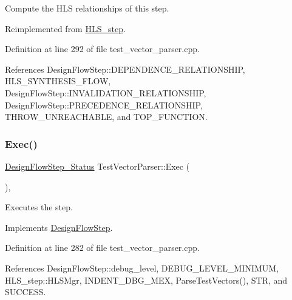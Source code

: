 Compute the H\+LS relationships of this step. 



Reimplemented from \hyperlink{classHLS__step_aed0ce8cca9a1ef18e705fc1032ad4de5}{H\+L\+S\+\_\+step}.



Definition at line 292 of file test\+\_\+vector\+\_\+parser.\+cpp.



References Design\+Flow\+Step\+::\+D\+E\+P\+E\+N\+D\+E\+N\+C\+E\+\_\+\+R\+E\+L\+A\+T\+I\+O\+N\+S\+H\+IP, H\+L\+S\+\_\+\+S\+Y\+N\+T\+H\+E\+S\+I\+S\+\_\+\+F\+L\+OW, Design\+Flow\+Step\+::\+I\+N\+V\+A\+L\+I\+D\+A\+T\+I\+O\+N\+\_\+\+R\+E\+L\+A\+T\+I\+O\+N\+S\+H\+IP, Design\+Flow\+Step\+::\+P\+R\+E\+C\+E\+D\+E\+N\+C\+E\+\_\+\+R\+E\+L\+A\+T\+I\+O\+N\+S\+H\+IP, T\+H\+R\+O\+W\+\_\+\+U\+N\+R\+E\+A\+C\+H\+A\+B\+LE, and T\+O\+P\+\_\+\+F\+U\+N\+C\+T\+I\+ON.

\mbox{\label{classTestVectorParser_a88660488c77a6d59a68893a4e74cf662}} 
\subsubsection{\texorpdfstring{Exec()}{Exec()}}
{\footnotesize\ttfamily \hyperlink{design__flow__step_8hpp_afb1f0d73069c26076b8d31dbc8ebecdf}{Design\+Flow\+Step\+\_\+\+Status} Test\+Vector\+Parser\+::\+Exec (\begin{DoxyParamCaption}{ }\end{DoxyParamCaption})\hspace{0.3cm}{\ttfamily [override]}, {\ttfamily [virtual]}}



Executes the step. 



Implements \hyperlink{classDesignFlowStep_a77d7e38493016766098711ea24f60b89}{Design\+Flow\+Step}.



Definition at line 282 of file test\+\_\+vector\+\_\+parser.\+cpp.



References Design\+Flow\+Step\+::debug\+\_\+level, D\+E\+B\+U\+G\+\_\+\+L\+E\+V\+E\+L\+\_\+\+M\+I\+N\+I\+M\+UM, H\+L\+S\+\_\+step\+::\+H\+L\+S\+Mgr, I\+N\+D\+E\+N\+T\+\_\+\+D\+B\+G\+\_\+\+M\+EX, Parse\+Test\+Vectors(), S\+TR, and S\+U\+C\+C\+E\+SS.

